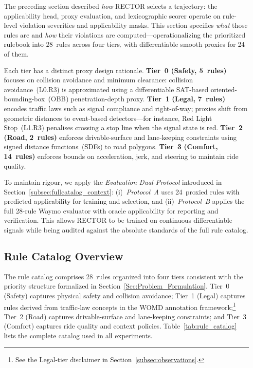 The preceding section described \emph{how} RECTOR selects a trajectory: the applicability head, proxy evaluation, and lexicographic scorer operate on rule-level violation severities and applicability masks.  This section specifies \emph{what} those rules are and \emph{how} their violations are computed---operationalizing the prioritized rulebook into 28~rules across four tiers, with differentiable smooth proxies for 24 of them.

Each tier has a distinct proxy design rationale.  \textbf{Tier~0 (Safety, 5~rules)} focuses on collision avoidance and minimum clearance: collision avoidance~(L0.R3) is approximated using a differentiable SAT-based oriented-bounding-box~(OBB) penetration-depth proxy.  \textbf{Tier~1 (Legal, 7~rules)} encodes traffic laws such as signal compliance and right-of-way; proxies shift from geometric distances to event-based detectors---for instance, Red Light Stop~(L1.R3) penalises crossing a stop line when the signal state is red. \textbf{Tier~2 (Road, 2~rules)} enforces drivable-surface and lane-keeping constraints using signed distance functions~(SDFs) to road polygons. \textbf{Tier~3 (Comfort, 14~rules)} enforces bounds on acceleration, jerk, and steering to maintain ride quality.

To maintain rigour, we apply the \emph{Evaluation Dual-Protocol} introduced in Section~\ref{subsec:fullcatalog_context}: (i)~\emph{Protocol~A} uses 24~proxied rules with predicted applicability for training and selection, and (ii)~\emph{Protocol~B} applies the full 28-rule Waymo evaluator with oracle applicability for reporting and verification.  This allows \textsc{RECTOR} to be trained on continuous differentiable signals while being audited against the absolute standards of the full rule catalog.

\subsection{Rule Catalog Overview}
\label{subsec:rule_catalog}

The rule catalog comprises 28~rules organized into four tiers consistent with the priority structure formalized in Section~\ref{Sec:Problem_Formulation}.  Tier~0 (Safety) captures physical safety and collision avoidance; Tier~1 (Legal) captures rules derived from traffic-law concepts in the WOMD annotation framework;\footnote{See the Legal-tier disclaimer in Section~\ref{subsec:observations}.} Tier~2 (Road) captures drivable-surface and lane-keeping constraints; and Tier~3 (Comfort) captures ride quality and context policies. Table~\ref{tab:rule_catalog} lists the complete catalog used in all experiments.

